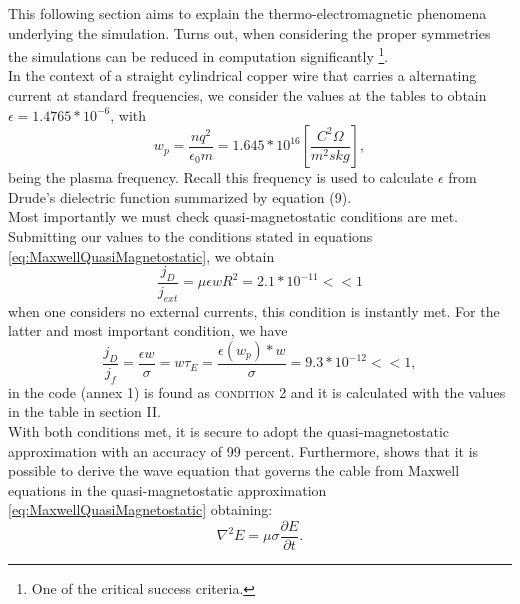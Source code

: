 \label{sec:RESULTS}

This following section aims to explain the thermo-electromagnetic phenomena underlying the simulation. Turns out, when considering the proper symmetries the simulations can be reduced in computation significantly \footnote{One of the critical success criteria.}.
\\

In the context of a straight cylindrical copper wire that carries a alternating current at standard frequencies, we consider the values at the tables to obtain $\epsilon = 1.4765 * 10^{-6}$, with
\begin{equation}
    w_p = \frac{nq^2}{\epsilon_0 m} = 1.645* 10^{16} [\frac{C^2 \Omega}{ m^2 s kg}],
\end{equation}
being the plasma frequency. Recall this frequency is used to calculate $\epsilon $ from Drude's dielectric function summarized by equation (9).
\\
Most importantly we must check quasi-magnetostatic conditions are met. Submitting our values to the conditions stated in equations \ref{eq:MaxwellQuasiMagnetostatic}, we obtain
\begin{equation*}
    \frac{j_D}{j_{ext}} =  \mu\epsilon w  R^2 = 2.1*10^{-11} << 1
\end{equation*}
when one considers no external currents, this condition is instantly met. For the latter and most important condition, we have
\begin{equation*}
     \frac{j_D}{j_{f}} = \frac{\epsilon w}{\sigma} = w \tau_E = \frac{\epsilon(w_p)*w}{\sigma}= 9.3*10^{-12} << 1,
\end{equation*}
in the code (annex 1) is found as \textsc{condition 2} and it is calculated with the values in the table in section II. \\

With both conditions met, it is secure to adopt the quasi-magnetostatic approximation with an accuracy of 99 percent. Furthermore, \cite{zangwill2013modern} shows that it is possible to derive the wave equation that governs the cable from Maxwell equations in the quasi-magnetostatic approximation \ref{eq:MaxwellQuasiMagnetostatic} obtaining:
\begin{equation}
    \nabla ^2 E =  \mu \sigma \frac{\partial E}{\partial t}.
\end{equation}

